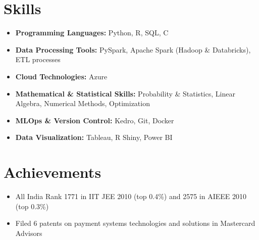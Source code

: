 \documentclass[a4paper,10pt]{article}
\begin{document}
\section*{Skills}
\begin{itemize}[leftmargin=0.2cm, label={}]
    \item \textbf{Programming Languages:} Python, R, SQL, C
    \item \textbf{Data Processing Tools:} PySpark, Apache Spark (Hadoop \& Databricks), ETL processes
    \item \textbf{Cloud Technologies:} Azure
    \item \textbf{Mathematical \& Statistical Skills:} Probability \& Statistics, Linear Algebra, Numerical Methods, Optimization
    \item \textbf{MLOps \& Version Control:} Kedro, Git, Docker 
    \item \textbf{Data Visualization:} Tableau, R Shiny, Power BI
\end{itemize}



\section*{Achievements}
\begin{itemize}[leftmargin=0.2cm, label={}]
    \item All India Rank 1771 in IIT JEE 2010 (top 0.4\%) and 2575 in AIEEE 2010 (top 0.3\%)
    \item Filed 6 patents on payment systems technologies and solutions in Mastercard Advisors
\end{itemize}
\end{document}
